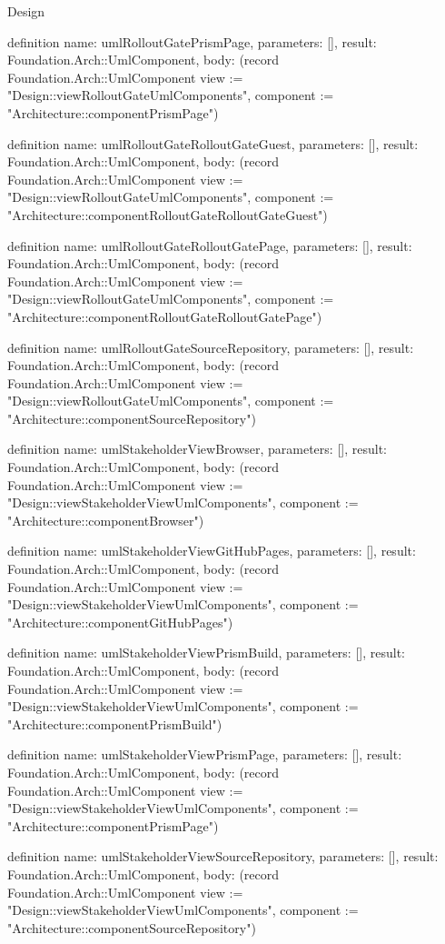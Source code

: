 \begin{lexlean}{Design}
\begin{semanticmodule}
definition{
  name: umlRolloutGatePrismPage,
  parameters: [],
  result: Foundation.Arch::UmlComponent,
  body: (record Foundation.Arch::UmlComponent {view := "Design::viewRolloutGateUmlComponents", component := "Architecture::componentPrismPage"})
}

definition{
  name: umlRolloutGateRolloutGateGuest,
  parameters: [],
  result: Foundation.Arch::UmlComponent,
  body: (record Foundation.Arch::UmlComponent {view := "Design::viewRolloutGateUmlComponents", component := "Architecture::componentRolloutGateRolloutGateGuest"})
}

definition{
  name: umlRolloutGateRolloutGatePage,
  parameters: [],
  result: Foundation.Arch::UmlComponent,
  body: (record Foundation.Arch::UmlComponent {view := "Design::viewRolloutGateUmlComponents", component := "Architecture::componentRolloutGateRolloutGatePage"})
}

definition{
  name: umlRolloutGateSourceRepository,
  parameters: [],
  result: Foundation.Arch::UmlComponent,
  body: (record Foundation.Arch::UmlComponent {view := "Design::viewRolloutGateUmlComponents", component := "Architecture::componentSourceRepository"})
}

definition{
  name: umlStakeholderViewBrowser,
  parameters: [],
  result: Foundation.Arch::UmlComponent,
  body: (record Foundation.Arch::UmlComponent {view := "Design::viewStakeholderViewUmlComponents", component := "Architecture::componentBrowser"})
}

definition{
  name: umlStakeholderViewGitHubPages,
  parameters: [],
  result: Foundation.Arch::UmlComponent,
  body: (record Foundation.Arch::UmlComponent {view := "Design::viewStakeholderViewUmlComponents", component := "Architecture::componentGitHubPages"})
}

definition{
  name: umlStakeholderViewPrismBuild,
  parameters: [],
  result: Foundation.Arch::UmlComponent,
  body: (record Foundation.Arch::UmlComponent {view := "Design::viewStakeholderViewUmlComponents", component := "Architecture::componentPrismBuild"})
}

definition{
  name: umlStakeholderViewPrismPage,
  parameters: [],
  result: Foundation.Arch::UmlComponent,
  body: (record Foundation.Arch::UmlComponent {view := "Design::viewStakeholderViewUmlComponents", component := "Architecture::componentPrismPage"})
}

definition{
  name: umlStakeholderViewSourceRepository,
  parameters: [],
  result: Foundation.Arch::UmlComponent,
  body: (record Foundation.Arch::UmlComponent {view := "Design::viewStakeholderViewUmlComponents", component := "Architecture::componentSourceRepository"})
}


\end{semanticmodule}
\end{lexlean}
